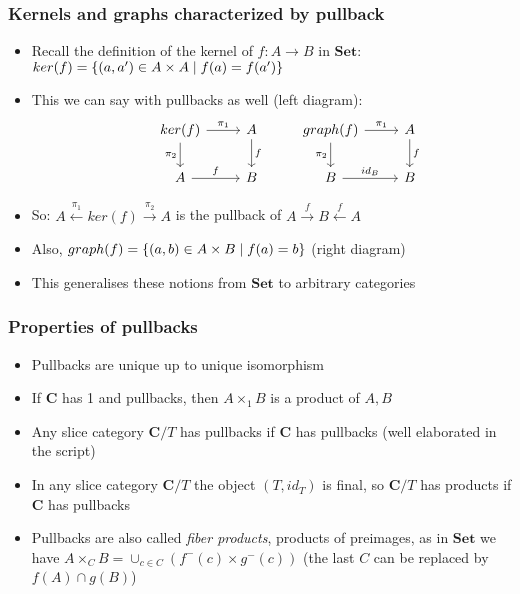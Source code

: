 \documentclass[handout]{beamer}
\newcommand{\bfsf}[1]{{\boldsymbol{#1}}}
\newcommand{\Set}{\bfsf{Set}}
\newcommand{\CC}{\bfsf{C}}
\begin{document}
\frame
  {   
    \frametitle{Kernels and graphs characterized by pullback}\label{Ch4:PullbKer}

 \begin{itemize}[<+->]
\item Recall the definition of the kernel of $f: A\to B$ in $\Set$:
$ker(f) = \{(a,a') \in A\times A \mid f(a)=f(a')\}$

\item This we can say with pullbacks as well (left diagram):
\[
\begin{tikzcd}[ampersand replacement=\&]
\& 
ker(f) \arrow{r}{\pi_1}\arrow[swap]{d}{\pi_2}\&
A\arrow{d}{f}\& 
graph(f) \arrow{r}{\pi_1}\arrow[swap]{d}{\pi_2}\&
A\arrow{d}{f}\\
\&
A\arrow{r}{f} \&
B 
\&
B\arrow{r}{id_B} \&
B 
\end{tikzcd}
\]
\item So:  
$A\stackrel{\pi_1}{\leftarrow} ker(f) \stackrel{\pi_2}{\to}A$
is the pullback of 
$A\stackrel{f}{\to} B\stackrel{f}{\leftarrow}A$
\item Also, $graph(f) = \{(a,b) \in A\times B \mid f(a)=b\}$ (right diagram)
\item This generalises these notions from $\Set$ to arbitrary categories

 \end{itemize}

 }

\frame
  {   
    \frametitle{Properties of pullbacks}\label{Ch4:PullbProp}

 \begin{itemize}[<+->]
\item Pullbacks are unique up to unique isomorphism
\item If $\CC$ has 1 and pullbacks, then $A\times_1 B$ is a product
of $A,B$ 
\item Any slice category $\CC/T$ has pullbacks if $\CC$ has pullbacks
(well elaborated in the script)
\item In any slice category $\CC/T$ the object $(T,id_T)$ is final, so $\CC/T$
has products if $\CC$ has pullbacks
\item Pullbacks are also called \emph{fiber products}, products of preimages,
as in $\Set$ we have $A\times_C B = \cup_{c\in C} (f^-(c) \times g^-(c))$
(the last $C$ can be replaced by $f(A)\cap g(B)$)


 \end{itemize}

 }
\end{document}
